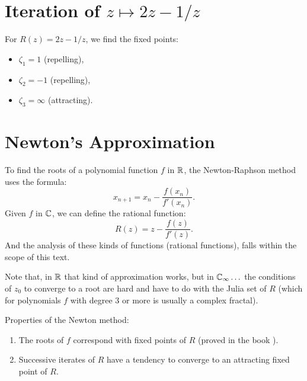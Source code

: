 \section{Iteration of $z \mapsto 2z - 1/z$}
\label{sec:iteration_of_two_z_minus_one_over_z}

For $R(z) = 2z - 1/z$, we find the fixed points:
\begin{itemize}
    \item $\zeta_1 = 1$ (repelling),
    \item $\zeta_2 = -1$ (repelling),
    \item $\zeta_3 = \infty$ (attracting).
\end{itemize}

\section{Newton's Approximation}
\label{sec:newtons_approximation}

To find the roots of a polynomial function $f$ in $\mathbb{R}$, the Newton-Raphson
method uses the formula:
\begin{equation*}
    x_{n+1} = x_n - \frac{f(x_n)}{f'(x_n)}.
\end{equation*}
Given $f$ in $\mathbb{C}$, we can define the rational function:
\begin{equation*}
    R(z) = z - \frac{f(z)}{f'(z)}.
\end{equation*}
And the analysis of these kinds of functions (rational functions), falls within
the scope of this text.

Note that, in $\mathbb{R}$ that kind of approximation works, but in $\mathbb{C}_\infty\ldots$ the
conditions of $z_0$ to converge to a root are hard and have to do with the Julia
set of $R$ (which for polynomials $f$ with degree $3$ or more is usually a
complex fractal).

Properties of the Newton method:
\begin{enumerate}[label=(\roman*)]
    \item The roots of $f$ correspond with fixed points of $R$ (proved in the
    book \cite{Beardon1991}).
    \item Successive iterates of $R$ have a tendency to converge to an
    attracting fixed point of $R$.
\end{enumerate}

